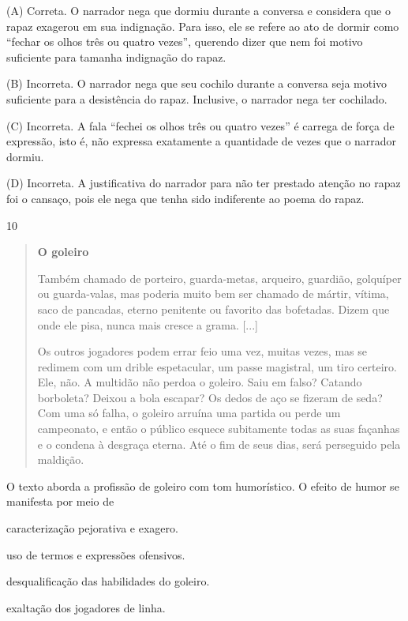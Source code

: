 (A) Correta. O narrador nega que dormiu durante a conversa e considera
que o rapaz exagerou em sua indignação. Para isso, ele se refere ao ato
de dormir como ``fechar os olhos três ou quatro vezes'', querendo dizer
que nem foi motivo suficiente para tamanha indignação do rapaz.

(B) Incorreta. O narrador nega que seu cochilo durante a conversa seja
motivo suficiente para a desistência do rapaz. Inclusive, o narrador
nega ter cochilado.

(C) Incorreta. A fala ``fechei os olhos três ou quatro vezes'' é carrega
de força de expressão, isto é, não expressa exatamente a quantidade de
vezes que o narrador dormiu.

(D) Incorreta. A justificativa do narrador para não ter prestado atenção
no rapaz foi o cansaço, pois ele nega que tenha sido indiferente ao
poema do rapaz.

\num{10}

\begin{quote}
\textbf{O goleiro}

Também chamado de porteiro, guarda-metas, arqueiro, guardião, golquíper
ou guarda-valas, mas poderia muito bem ser chamado de mártir, vítima,
saco de pancadas, eterno penitente ou favorito das bofetadas. Dizem que
onde ele pisa, nunca mais cresce a grama. {[}...{]}

Os outros jogadores podem errar feio uma vez, muitas vezes, mas se
redimem com um drible espetacular, um passe magistral, um tiro certeiro.
Ele, não. A multidão não perdoa o goleiro. Saiu em falso? Catando
borboleta? Deixou a bola escapar? Os dedos de aço se fizeram de seda?
Com uma só falha, o goleiro arruína uma partida ou perde um campeonato,
e então o público esquece subitamente todas as suas façanhas e o condena
à desgraça eterna. Até o fim de seus dias, será perseguido pela
maldição.
\end{quote}


O texto aborda a profissão de goleiro com tom humorístico. O efeito de
humor se manifesta por meio de

\begin{escolha}
\item caracterização pejorativa e exagero.

\item uso de termos e expressões ofensivos.

\item desqualificação das habilidades do goleiro.

\item exaltação dos jogadores de linha.
\end{escolha}

